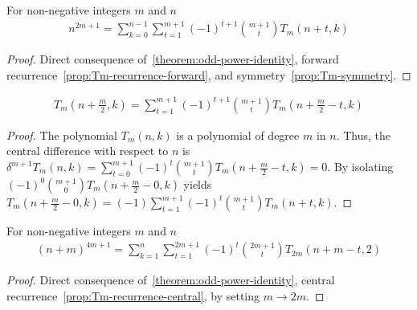 \begin{proposition}
    \label{prop:odd-power-decomposition-forward-shifted}
    For non-negative integers $m$ and $n$
    \begin{align*}
        n^{2m+1} = \sum_{k=0}^{n-1} \sum_{t=1}^{m+1} (-1)^{t+1} \binom{m+1}{t} T_{m} (n+t, k)
    \end{align*}
    \begin{proof}
        Direct consequence of~\eqref{theorem:odd-power-identity},
        forward recurrence~\eqref{prop:Tm-recurrence-forward}, and symmetry~\eqref{prop:Tm-symmetry}.
    \end{proof}
\end{proposition}

\begin{proposition}
    \label{prop:Tm-recurrence-central}
    \begin{align*}
        T_{m} \left(n + \frac{m}{2}, k \right)
        = \sum_{t=1}^{m+1} (-1)^{t+1} \binom{m+1}{t} T_{m} \left( n+\frac{m}{2}-t, k \right)
    \end{align*}
    \begin{proof}
        The polynomial $T_{m} (n,k)$ is a polynomial of degree $m$ in $n$.
        Thus, the central difference with respect to $n$ is
        $\delta^{m+1} T_{m} (n, k) = \sum_{t=0}^{m+1} (-1)^{t} \binom{m+1}{t} T_{m} \left(n+\frac{m}{2} - t, k\right) = 0$.
        By isolating $(-1)^{0} \binom{m+1}{0} T_{m} \left(n+\frac{m}{2}-0, k\right)$ yields
        $T_{m} \left(n+\frac{m}{2}-0, k\right) = (-1) \sum_{t=1}^{m+1} (-1)^{t} \binom{m+1}{t} T_{m} (n+t, k)$.
    \end{proof}
\end{proposition}

\begin{proposition}
    For non-negative integers $m$ and $n$
    \label{prop:odd-power-decomposition-central}
    \begin{align*}
    (n+m)
        ^{4m+1} = \sum_{k=1}^{n} \sum_{t=1}^{2m+1} (-1)^{t} \binom{2m+1}{t} T_{2m} (n+m-t, 2)
    \end{align*}
    \begin{proof}
        Direct consequence of~\eqref{theorem:odd-power-identity}, central recurrence~\eqref{prop:Tm-recurrence-central},
        by setting $m \rightarrow 2m$.
    \end{proof}
\end{proposition}

